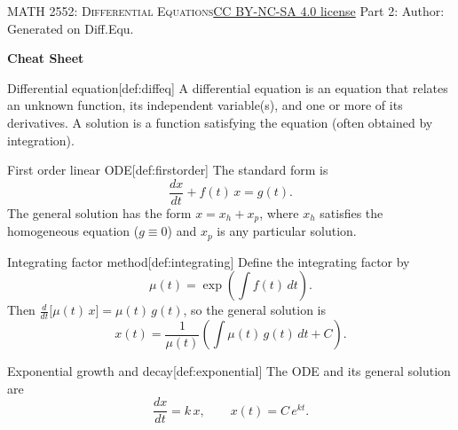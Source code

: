 \newpage\handout
{\textsc{MATH 2552: Differential Equations}}{\href{https://creativecommons.org/licenses/by-nc-sa/4.0/}{CC BY-NC-SA 4.0 license}}
{Part 2: }
{Author: \href{\HandoutAuthorUrl}{\HandoutAuthor}}{Generated on \generatedOn}
{Diff.Equ.}

\newpage






\textbf{Cheat Sheet}\\[0.5em]

\begin{define}{Differential equation}[def:diffeq]
  A differential equation is an equation that relates an 
  unknown function, its independent variable(s), and one 
  or more of its derivatives. A solution is a function 
  satisfying the equation (often obtained by integration).
\end{define}

\begin{define}{First order linear ODE}[def:firstorder]
  The standard form is
$$
\frac{dx}{dt} + f(t)\,x = g(t).
$$
  The general solution has the form $x = x_h + x_p$, 
  where $x_h$ satisfies the homogeneous equation 
  ($g \equiv 0$) and $x_p$ is any particular solution.
\end{define}

\begin{define}{Integrating factor method}[def:integrating]
  Define the integrating factor by
$$
\mu(t) = \exp\left(\int f(t)\,dt\right).
$$
  Then $\frac{d}{dt}\bigl[\mu(t)\,x\bigr] = \mu(t)\,g(t)$, so the general solution is
  $$
  x(t) = \frac{1}{\mu(t)}\left(\int \mu(t)\,g(t)\,dt + C\right).
  $$
\end{define}

\begin{define}{Exponential growth and decay}[def:exponential]
  The ODE and its general solution are
$$
  \frac{dx}{dt} = k\,x,\qquad x(t) = C\,e^{kt}.
  $$
\end{define}

